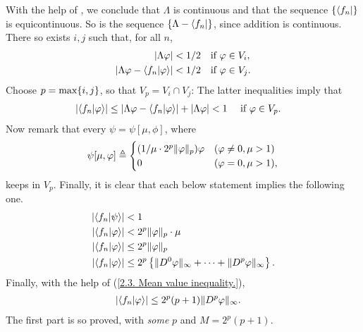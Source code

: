 %
With the help of , we conclude that %
%
  $\Lambda$ is continuous 
%
and that the sequence
%
  $\{\bra{f_n}\}$ %
%
is equicontinuous. 
%
So is the sequence %
%
  $\{\Lambda - \bra{f_n}\}$, %
%
since addition is continuous.
%
There so exists $i, j$ such that, for all $n$, 
%
  \begin{align}
    \left\lvert 
      \Lambda \varphi 
    \right\rvert
      < 
    1/2 & \quad \text{if }\varphi\in V_i, \\
    \left\lvert 
      \Lambda\varphi - \bra{f_n}\ket{\varphi} 
    \right\rvert  
      < 
    1/2 & \quad \text{if } \varphi\in V_j.
  \end{align}
%
Choose $p = \max\{i, j\}$, so that $V_p = V_i \cap V_j$: %
The latter inequalities imply that %
%
  \begin{align}
    \left\lvert \bra{f_n}\ket{\phi} \right\rvert  & \leq 
      \magnitude{
        \Lambda\phi 
        - \bra{f_n }\ket{\phi} 
      }
      + 
      \magnitude{\Lambda \phi}
     < 1 \
       \quad\text{if } \phi\in V_p. %
  \end{align}
%
Now remark that every $\psi =\psi[\mu, \phi]$, where %
%
  \begin{align}
     \psi[\mu, \varphi] \triangleq 
      \begin{cases}
        ({1}/{\mu \cdot 2^{p} \|\varphi \|_p}) \varphi & (\varphi \neq 0, \mu > 1)\\
        0                                          & (\varphi   =  0, \mu > 1),  
      \end{cases}
  \end{align}
%
keeps in $V_p$. Finally, %
it is clear that each below statement implies the following one.
%
  \begin{align}
    \lvert \langle {f_n}  | \psi \rangle \rvert &  
    < 1 \\
    \left\lvert \bra{f_n}\ket{\varphi} \right\rvert &  
    < 2^{p}  \| \varphi \|_p \cdot \mu \\
    \left\lvert \bra{f_n}\ket{\varphi} \right\rvert & 
    \leq 2^{p} \| \varphi \|_p \\
     \left\lvert \bra{f_n}\ket{\varphi} \right\rvert &
     \leq 2^{p} \left\{\| D^0 \varphi \|_\infty 
       + 
         \cdots 
      + 
        \| D^p \varphi \|_\infty\right\}.
  \end{align}
  Finally, with the help of (\ref{2.3. Mean value inequality.}), 
  \begin{align}
    \label{2.3. Bound with p and M (theoritical).}
     \left\lvert \bra{f_n}\ket{\varphi} \right\rvert &
       \leq 
      2^{p} (p+1) \| D^p \varphi \|_\infty .
  \end{align}
%
The first part is so proved, with \textit{some} $p$ and $ M= 2^{p}(p+1)$. %
\newline\newline\noindent
%
